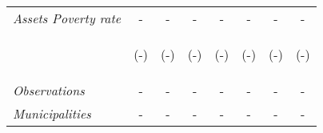 \begin{tabular}{lccccccc}
\textit{Assets Poverty rate}          		  &  -    &   -    &     -  &     -  &    -  &     - &    -    \\
\vspace{4pt} & \begin{footnotesize}(-)\end{footnotesize} &  \begin{footnotesize}(-)\end{footnotesize}  &  \begin{footnotesize}(-)\end{footnotesize}    &   \begin{footnotesize}(-)\end{footnotesize}   &   \begin{footnotesize}(-)\end{footnotesize}  &  \begin{footnotesize}(-)\end{footnotesize} &  \begin{footnotesize}(-)\end{footnotesize} \\          


\hline		
\hline		


\textit{Observations}                 &   -    &    -      &  -     & -   &	 -   &	  -    &  -   \\
\textit{Municipalities}               &   -   &    -     &  -    & -  &  -  &	  -   &  -	\\
\hline		
\hline	


\end{tabular}%
